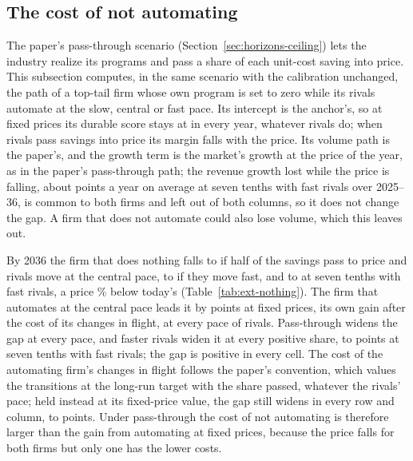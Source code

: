 \subsection{The cost of not automating}\label{supp:ext-nothing}
The paper's pass-through scenario (Section~\ref{sec:horizons-ceiling}) lets the industry realize its programs and pass a share of each unit-cost saving into price. This subsection computes, in the same scenario with the calibration unchanged, the path of a top-tail firm whose own program is set to zero while its rivals automate at the slow, central or fast pace. Its intercept is the anchor's, so at fixed prices its durable score stays at \ExNoneFixed{} in every year, whatever rivals do; when rivals pass savings into price its margin falls with the price. Its volume path is the paper's, and the growth term is the market's growth at the price of the year, as in the paper's pass-through path; the revenue growth lost while the price is falling, about \ExPriceFallYr{} points a year on average at seven tenths with fast rivals over 2025--36, is common to both firms and left out of both columns, so it does not change the gap. A firm that does not automate could also lose volume, which this leaves out.



By 2036 the firm that does nothing falls to \ExNoneHalfCen{} if half of the savings pass to price and rivals move at the central pace, to \ExNoneHalfFast{} if they move fast, and to \ExNoneSevenFast{} at seven tenths with fast rivals, a price \ExPriceSevenFast\% below today's (Table~\ref{tab:ext-nothing}). The firm that automates at the central pace leads it by \ExGapFixed{} points at fixed prices, its own gain after the cost of its changes in flight, at every pace of rivals. Pass-through widens the gap at every pace, and faster rivals widen it at every positive share, to \ExGapSevenFast{} points at seven tenths with fast rivals; the gap is positive in every cell. The cost of the automating firm's changes in flight follows the paper's convention, which values the transitions at the long-run target with the share passed, whatever the rivals' pace; held instead at its fixed-price value, the gap still widens in every row and column, to \ExGapSevenFastDipFixed{} points. Under pass-through the cost of not automating is therefore larger than the gain from automating at fixed prices, because the price falls for both firms but only one has the lower costs.

